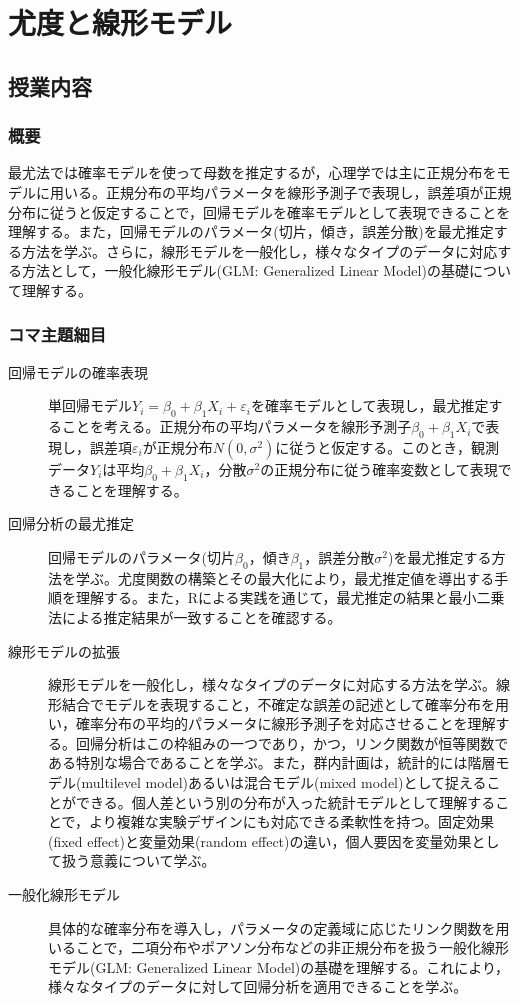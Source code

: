\section{尤度と線形モデル}
\label{b24_linear_model}

\subsection{授業内容}

\subsubsection{概要}
最尤法では確率モデルを使って母数を推定するが，心理学では主に正規分布をモデルに用いる。正規分布の平均パラメータを線形予測子で表現し，誤差項が正規分布に従うと仮定することで，回帰モデルを確率モデルとして表現できることを理解する。また，回帰モデルのパラメータ(切片，傾き，誤差分散)を最尤推定する方法を学ぶ。さらに，線形モデルを一般化し，様々なタイプのデータに対応する方法として，一般化線形モデル(GLM: Generalized Linear Model)の基礎について理解する。

\subsubsection{コマ主題細目}
\begin{description}
	\item[回帰モデルの確率表現] 単回帰モデル$Y_i = \beta_0 + \beta_1 X_i + \varepsilon_i$を確率モデルとして表現し，最尤推定することを考える。正規分布の平均パラメータを線形予測子$\beta_0 + \beta_1 X_i$で表現し，誤差項$\varepsilon_i$が正規分布$N(0, \sigma^2)$に従うと仮定する。このとき，観測データ$Y_i$は平均$\beta_0 + \beta_1 X_i$，分散$\sigma^2$の正規分布に従う確率変数として表現できることを理解する。
    \item[回帰分析の最尤推定] 回帰モデルのパラメータ(切片$\beta_0$，傾き$\beta_1$，誤差分散$\sigma^2$)を最尤推定する方法を学ぶ。尤度関数の構築とその最大化により，最尤推定値を導出する手順を理解する。また，Rによる実践を通じて，最尤推定の結果と最小二乗法による推定結果が一致することを確認する。
    \item[線形モデルの拡張] 線形モデルを一般化し，様々なタイプのデータに対応する方法を学ぶ。線形結合でモデルを表現すること，不確定な誤差の記述として確率分布を用い，確率分布の平均的パラメータに線形予測子を対応させることを理解する。回帰分析はこの枠組みの一つであり，かつ，リンク関数が恒等関数である特別な場合であることを学ぶ。また，群内計画は，統計的には階層モデル(multilevel model)あるいは混合モデル(mixed model)として捉えることができる。個人差という別の分布が入った統計モデルとして理解することで，より複雑な実験デザインにも対応できる柔軟性を持つ。固定効果(fixed effect)と変量効果(random effect)の違い，個人要因を変量効果として扱う意義について学ぶ。
    \item[一般化線形モデル] 具体的な確率分布を導入し，パラメータの定義域に応じたリンク関数を用いることで，二項分布やポアソン分布などの非正規分布を扱う一般化線形モデル(GLM: Generalized Linear Model)の基礎を理解する。これにより，様々なタイプのデータに対して回帰分析を適用できることを学ぶ。
\end{description}
